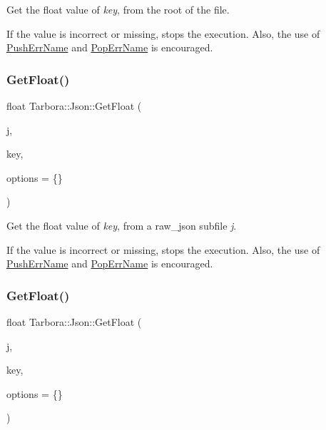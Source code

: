 Get the float value of {\itshape key}, from the root of the file. 

If the value is incorrect or missing, stops the execution. Also, the use of \hyperlink{classTarbora_1_1Json_a061eac4f16dac3b9b3a26a66de0ea8f0}{Push\+Err\+Name} and \hyperlink{classTarbora_1_1Json_a14019f06d3bd76edd6a6e78134519d11}{Pop\+Err\+Name} is encouraged. \mbox{\label{classTarbora_1_1Json_afe9349b6e3a14cca1c2e7aee6162ffca}} 
\subsubsection{\texorpdfstring{Get\+Float()}{GetFloat()}\hspace{0.1cm}{\footnotesize\ttfamily [2/3]}}
{\footnotesize\ttfamily float Tarbora\+::\+Json\+::\+Get\+Float (\begin{DoxyParamCaption}\item[{raw\+\_\+json}]{j,  }\item[{const char $\ast$}]{key,  }\item[{\hyperlink{structTarbora_1_1JsonOptions}{Json\+Options}}]{options = {\ttfamily \{\}} }\end{DoxyParamCaption})}



Get the float value of {\itshape key}, from a raw\+\_\+json subfile {\itshape j}. 

If the value is incorrect or missing, stops the execution. Also, the use of \hyperlink{classTarbora_1_1Json_a061eac4f16dac3b9b3a26a66de0ea8f0}{Push\+Err\+Name} and \hyperlink{classTarbora_1_1Json_a14019f06d3bd76edd6a6e78134519d11}{Pop\+Err\+Name} is encouraged. \mbox{\label{classTarbora_1_1Json_ac326e0735a6a1cc0afa0eb43e9872179}} 
\subsubsection{\texorpdfstring{Get\+Float()}{GetFloat()}\hspace{0.1cm}{\footnotesize\ttfamily [3/3]}}
{\footnotesize\ttfamily float Tarbora\+::\+Json\+::\+Get\+Float (\begin{DoxyParamCaption}\item[{raw\+\_\+json}]{j,  }\item[{int}]{key,  }\item[{\hyperlink{structTarbora_1_1JsonOptions}{Json\+Options}}]{options = {\ttfamily \{\}} }\end{DoxyParamCaption})}

